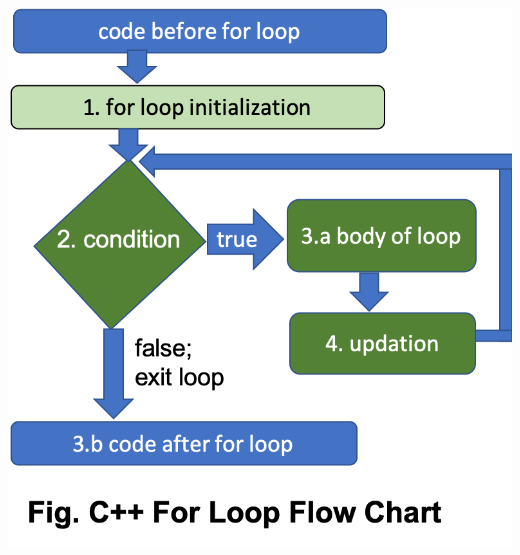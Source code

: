 \documentclass[11pt]{article}
\begin{document}
\includegraphics{resources/For-Loop.png}
\end{document}
